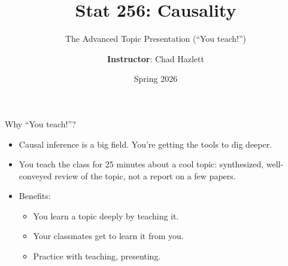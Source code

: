 \documentclass[xcolor=dvipsnames]{beamer}
\title{Stat 256: Causality}
\date{Spring 2026}
\subtitle[ ]{The Advanced Topic Presentation (``You teach!'')}
\author{\textbf{Instructor}: Chad Hazlett}
\institute[UCLA]{UCLA\\[1ex]}
\begin{document}
\begin{frame}
  \titlepage
\end{frame}


\begin{frame}{Why ``You teach!''?}
\begin{itemize}
    \item<1-> Causal inference is a big field. You're getting the tools to dig deeper.
    \medskip
    \item<2-> You teach the class for 25 minutes about a cool topic: synthesized, well-conveyed review of the topic, not a report on a few papers.
    \medskip
    \item<4-> Benefits:
    \begin{itemize}
        \item You learn a topic deeply by teaching it.
        \item Your classmates get to learn it from you.
        \item Practice with teaching, presenting.
    \end{itemize}
\end{itemize}
\end{frame}


\end{document}
